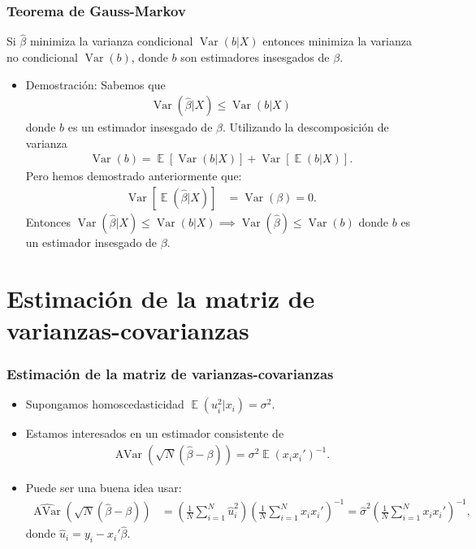 \documentclass[t, compress, spanish, aspectratio=169]{beamer}
\DeclareMathOperator{\Var}{Var}
\DeclareMathOperator{\Avar}{AVar}
\DeclareMathOperator{\E}{\mathbb{E}}
\begin{document}
	\begin{frame}
		\frametitle{Teorema de Gauss-Markov}
		Si $\hat \beta$ minimiza la varianza condicional $\Var(b|X)$ entonces minimiza la varianza no condicional $\Var(b)$, donde $b$ son estimadores insesgados de $\beta$.
		\begin{itemize}
			\item  <2->  Demostraci\'on: Sabemos que 
			\begin{align*}
				\Var(\hat \beta|X)\leq \Var(b|X)
			\end{align*} 
			donde $b$ es un estimador insesgado de $\beta$. Utilizando la descomposici\'on de varianza
			\begin{align*}
				\Var(b)=\E[\Var(b|X)]+\Var[\E(b|X)].
			\end{align*} 
			Pero hemos demostrado anteriormente que:
			\begin{align*}
				\Var[\E(\hat \beta|X)]&=\Var(\beta)=0.
			\end{align*}
			Entonces $\Var(\hat \beta|X) \leq \Var(b|X) \implies \Var(\hat \beta)\leq \Var(b)$ donde $b$ es un estimador insesgado de $\beta$.
		\end{itemize}
	\end{frame}
		
	\section{Estimaci\'on de la matriz de varianzas-covarianzas}
	\begin{frame}
			\frametitle{Estimaci\'on de la matriz de varianzas-covarianzas}
		\begin{itemize}
			\item Supongamos homoscedasticidad $\E(u_i^2|x_i) = \sigma^2$.
			\item [] Estamos interesados en un estimador consistente de 
			\begin{align*}
				\Avar(\sqrt{N} (\hat \beta - \beta))=\sigma^2\E(x_ix_i')^{-1}.
			\end{align*}
			\item <2-> [] Puede ser una buena idea usar:
			\small{
				\begin{align*}
					\widehat{\Avar}(\sqrt{N} (\hat \beta - \beta))&= \left(\frac{1}{N}\sum_{i=1}^{N}\hat u_i^2 \right)\left( \frac{1}{N}\sum_{i=1}^{N}x_ix_i'\right)^{-1}= \hat\sigma^2\left( \frac{1}{N}\sum_{i=1}^{N}x_ix_i'\right)^{-1},
				\end{align*}
			}
			donde $\hat u_i=y_i -x_i'\hat \beta$.
			\end{itemize}
	\end{frame}
	
\end{document}
